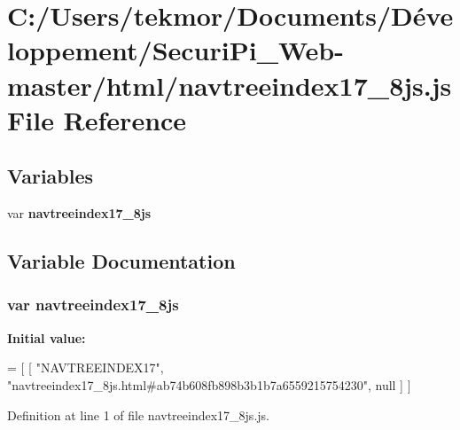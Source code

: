 \section{C\+:/\+Users/tekmor/\+Documents/\+Développement/\+Securi\+Pi\+\_\+\+Web-\/master/html/navtreeindex17\+\_\+8js.js File Reference}
\label{navtreeindex17__8js_8js}
\subsection*{Variables}
\begin{DoxyCompactItemize}
\item 
var {\bf navtreeindex17\+\_\+8js}
\end{DoxyCompactItemize}


\subsection{Variable Documentation}
\subsubsection[{navtreeindex17\+\_\+8js}]{\setlength{\rightskip}{0pt plus 5cm}var navtreeindex17\+\_\+8js}\label{navtreeindex17__8js_8js_af59871f06d5e595300ca84c56157fc1c}
{\bfseries Initial value\+:}
\begin{DoxyCode}
=
[
    [ \textcolor{stringliteral}{"NAVTREEINDEX17"}, \textcolor{stringliteral}{"navtreeindex17\_8js.html#ab74b608fb898b3b1b7a6559215754230"}, null ]
]
\end{DoxyCode}


Definition at line 1 of file navtreeindex17\+\_\+8js.\+js.

